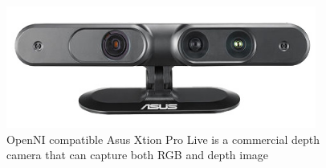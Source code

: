 \begin{figure}
	[h] \centering 
	\includegraphics[height=4cm]{figures/content/xtion.jpg} \caption{OpenNI compatible Asus Xtion Pro Live is a commercial depth camera that can capture both RGB and depth image \cite{asus-spec} } \label{fg:xtion} 
\end{figure}
